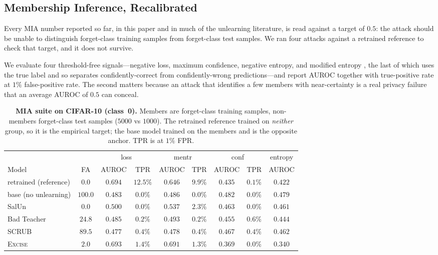 \documentclass{article}
\newcommand{\ours}{\textsc{Excise}}
\theoremstyle{remark}
\theoremstyle{plain}
\begin{document}
\subsection{Membership Inference, Recalibrated}\label{sec:mia}

Every MIA number reported so far, in this paper and in much of the unlearning
literature, is read against a target of $0.5$: the attack should be unable to
distinguish forget-class training samples from forget-class test samples. We ran
four attacks against a retrained reference to check that target, and it does not
survive.

We evaluate four threshold-free signals---negative loss, maximum confidence,
negative entropy, and modified entropy \citep{song2021systematic}, the last of
which uses the true label and so separates confidently-correct from
confidently-wrong predictions---and report AUROC together with true-positive
rate at $1\%$ false-positive rate. The second matters because an attack that
identifies a few members with near-certainty is a real privacy failure that an
average AUROC of $0.5$ can conceal.

\begin{table}[t]
\centering
\caption{\textbf{MIA suite on CIFAR-10 (class~0).} Members are forget-class
training samples, non-members forget-class test samples ($5000$ vs $1000$). The
retrained reference trained on \emph{neither} group, so it is the empirical
target; the base model trained on the members and is the opposite anchor.
TPR is at $1\%$ FPR.}
\label{tab:mia}
\begin{tabular}{@{}lcccccccc@{}}
\toprule
& & \multicolumn{2}{c}{loss} & \multicolumn{2}{c}{mentr} &
\multicolumn{2}{c}{conf} & entropy \\
\cmidrule(lr){3-4}\cmidrule(lr){5-6}\cmidrule(lr){7-8}\cmidrule(lr){9-9}
Model & FA & AUROC & TPR & AUROC & TPR & AUROC & TPR & AUROC \\
\midrule
retrained (reference) & $0.0$  & $0.694$ & $12.5\%$ & $0.646$ & $9.9\%$ & $0.435$ & $0.1\%$ & $0.422$ \\
base (no unlearning)  & $100.0$ & $0.483$ & $0.0\%$  & $0.486$ & $0.0\%$ & $0.482$ & $0.0\%$ & $0.479$ \\
\midrule
SalUn                 & $0.0$   & $0.500$ & $0.0\%$  & $0.537$ & $2.3\%$ & $0.463$ & $0.0\%$ & $0.461$ \\
Bad Teacher           & $24.8$  & $0.485$ & $0.2\%$  & $0.493$ & $0.2\%$ & $0.455$ & $0.6\%$ & $0.444$ \\
SCRUB                 & $89.5$  & $0.477$ & $0.4\%$  & $0.478$ & $0.4\%$ & $0.467$ & $0.4\%$ & $0.462$ \\
\ours{}               & $2.0$   & $0.693$ & $1.4\%$  & $0.691$ & $1.3\%$ & $0.369$ & $0.0\%$ & $0.340$ \\
\bottomrule
\end{tabular}
\end{table}
\end{document}
